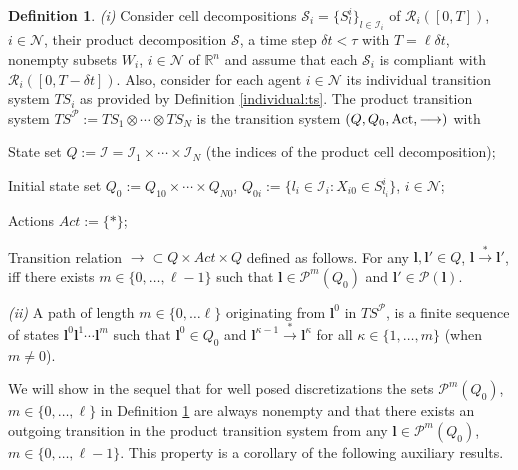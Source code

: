 \documentclass[reqno]{amsart}
\theoremstyle{plain}
\theoremstyle{definition}
\newtheorem{dfn}[thm]{Definition}
\numberwithin{equation}{section}
\begin{document}
\begin{dfn}\label{product:TS}
\textit{(i)} Consider cell decompositions ${\ensuremath{\mathcal{S}}}_i=\{S_l^i\}_{l\in{\ensuremath{\mathcal{I}}}_i}$ of ${\ensuremath{\mathcal{R}}}_i([0,T])$, $i\in{\ensuremath{\mathcal{N}}}$, their product decomposition ${\ensuremath{\mathcal{S}}}$, a time step $\delta t<\tau$ with $T=\ell\delta t$, nonempty subsets $W_i$, $i\in{\ensuremath{\mathcal{N}}}$ of ${\ensuremath{\mathbb{R}^{{n}}}}$ and assume that each ${\ensuremath{\mathcal{S}}}_i$ is compliant with  ${\ensuremath{\mathcal{R}}}_i([0,T-\delta t])$. Also, consider for each agent $i\in{\ensuremath{\mathcal{N}}}$ its individual transition system $TS_i$ as provided by Definition \ref{individual:ts}. The product transition system $TS^{\ensuremath{\mathcal{P}}}:=TS_1\otimes\cdots\otimes TS_N$ is the transition system $(Q,Q_0,{\rm Act},\longrightarrow)$ with

\noindent \textbullet \; State set $Q:={\ensuremath{\boldsymbol{\mathcal{I}}}}={\ensuremath{\mathcal{I}}}_1\times\cdots\times {\ensuremath{\mathcal{I}}}_N$  (the indices of the product cell decomposition);

\noindent \textbullet \; Initial state set $Q_0:=Q_{10}\times\cdots\times Q_{N0}$, $Q_{0i}:=\{l_i\in{\ensuremath{\mathcal{I}}}_i:X_{i0}\in S_{l_i}^i\}$, $i\in{\ensuremath{\mathcal{N}}}$;

\noindent \textbullet \; Actions $Act:=\{*\}$;

\noindent \textbullet \; Transition relation $\longrightarrow\subset Q\times Act\times Q$ defined as follows. For any ${\textbf{{l}}},{\textbf{{l}}}'\in Q$, ${\textbf{{l}}}\overset{*}{\longrightarrow}{\textbf{{l}}}'$, iff there exists $m\in\{0,\ldots,\ell-1\}$ such that ${\textbf{{l}}}\in {\ensuremath{\mathcal{P}}}^{m}(Q_0)$ and  ${\textbf{{l}}}'\in {\ensuremath{\mathcal{P}}}({\textbf{{l}}})$.

\noindent \textit{(ii)} A path of length $m\in\{0,\ldots\ell\}$ originating from ${\textbf{{l}}}^0 $ in $TS^{\ensuremath{\mathcal{P}}}$, is a finite sequence of states ${\textbf{{l}}}^0 {\textbf{{l}}}^1\cdots{\textbf{{l}}}^{m}$ such that  ${\textbf{{l}}}^0\in Q_0$ and $ {\textbf{{l}}}^{\kappa-1}\overset{*}{\longrightarrow}{\textbf{{l}}}^{\kappa}$ for all $\kappa\in\{1,\ldots,m\}$ (when $m\ne 0$).
\end{dfn}

We will show in the sequel that for well posed discretizations the sets ${\ensuremath{\mathcal{P}}}^{m}(Q_0)$, $m\in\{0,\ldots,\ell\}$ in Definition \ref{product:TS} are always nonempty and that there exists an outgoing transition in the product transition system from any  ${\textbf{{l}}}\in {\ensuremath{\mathcal{P}}}^{m}(Q_0)$,  $m\in\{0,\ldots,\ell-1\}$. This property is a corollary of the following auxiliary results. 
\end{document}

